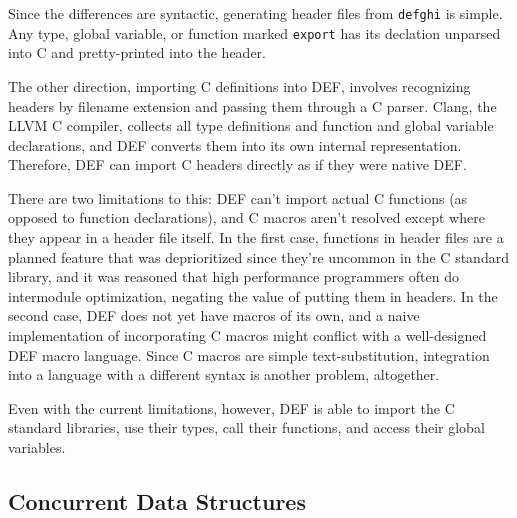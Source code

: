 Since the differences are syntactic, generating header files from \texttt{defghi} is simple.  Any type, global variable, or function marked \texttt{export} has its declation unparsed into C and pretty-printed into the header.

The other direction, importing C definitions into DEF, involves recognizing headers by filename extension and passing them through a C parser.  Clang, the LLVM C compiler, collects all type definitions and function and global variable declarations, and DEF converts them into its own internal representation.  Therefore, DEF can import C headers directly as if they were native DEF.

There are two limitations to this: DEF can't import actual C functions (as opposed to function declarations), and C macros aren't resolved except where they appear in a header file itself.  In the first case, functions in header files are a planned feature that was deprioritized since they're uncommon in the C standard library, and it was reasoned that high performance programmers often do intermodule optimization, negating the value of putting them in headers.  In the second case, DEF does not yet have macros of its own, and a naive implementation of incorporating C macros might conflict with a well-designed DEF macro language.  Since C macros are simple text-substitution, integration into a language with a different syntax is another problem, altogether.

Even with the current limitations, however, DEF is able to import the C standard libraries, use their types, call their functions, and access their global variables.

\subsection{Concurrent Data Structures}
